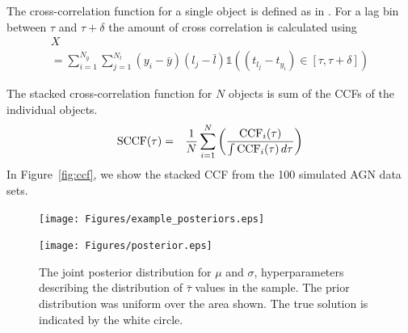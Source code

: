 \documentclass[useAMS,usenatbib]{mn2e}
\begin{document}
The cross-correlation function for a single object is defined as
in \citet{2012MNRAS.427.2701F}. For a lag bin between $\tau$ and $\tau + \delta$
the amount of cross correlation is calculated using
\begin{eqnarray}
X \\= \sum_{i=1}^{N_y}\sum_{j=1}^{N_l}
\left(y_i - \bar{y}\right)
\left(l_j - \bar{l}\right)
\mathds{1}\left((t_{l_j} - t_{y_i}) \in [\tau, \tau + \delta]\right)
\end{eqnarray}

The stacked cross-correlation function for $N$ objects is sum of the CCFs
of the individual objects.
\begin{eqnarray}
\textnormal{SCCF}(\tau) &=&
\frac{1}{N} \sum_{i=1}^N
\left(
\frac{\textnormal{CCF}_i(\tau)}{\int \textnormal{CCF}_i(\tau) \, d\tau}
\right)
\end{eqnarray}
In Figure~\ref{fig:ccf},
we show the stacked CCF from the 100 simulated AGN data sets.

\begin{figure}
\begin{center}
\texttt{[image: Figures/example\_posteriors.eps]}
\caption{\label{fig:example_posteriors}}
\end{center}
\end{figure}

\begin{figure}
\begin{center}
\texttt{[image: Figures/posterior.eps]}
\caption{The joint posterior distribution for $\mu$ and $\sigma$, hyperparameters
describing the distribution of $\bar{\tau}$ values in the sample. The prior
distribution was uniform over the area shown.
The true solution is indicated by the white circle.\label{fig:posterior}}
\end{center}
\end{figure}
\end{document}

